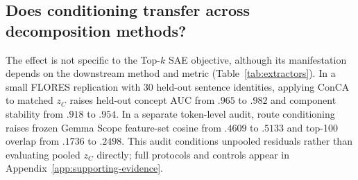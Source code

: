 \documentclass[11pt]{article}
\begin{document}
\subsection{Does conditioning transfer across decomposition methods?}
The effect is not specific to the Top-$k$ SAE objective, although its manifestation depends on the downstream method and metric (Table~\ref{tab:extractors}). In a small FLORES replication \citep{goyal2022flores} with 30 held-out sentence identities, applying ConCA to matched $z_C$ raises held-out concept AUC from $.965$ to $.982$ and component stability from $.918$ to $.954$. In a separate token-level audit, route conditioning raises frozen Gemma Scope feature-set cosine from $.4609$ to $.5133$ and top-100 overlap from $.1736$ to $.2498$. This audit conditions unpooled residuals rather than evaluating pooled $z_C$ directly; full protocols and controls appear in Appendix~\ref{app:supporting-evidence}.
\end{document}

